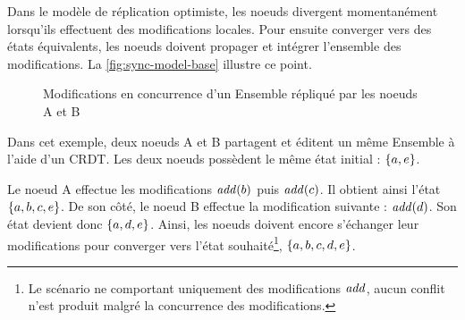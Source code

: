 Dans le modèle de réplication optimiste, les noeuds divergent momentanément lorsqu'ils effectuent des modifications locales.
Pour ensuite converger vers des états équivalents, les noeuds doivent propager et intégrer l'ensemble des modifications.
La \autoref{fig:sync-model-base} illustre ce point.

\begin{figure}[!ht]

  \centering
  \caption{Modifications en concurrence d'un Ensemble répliqué par les noeuds A et B}
  \label{fig:sync-model-base}
\end{figure}

Dans cet exemple, deux noeuds A et B partagent et éditent un même Ensemble à l'aide d'un \ac{CRDT}.
Les deux noeuds possèdent le même état initial : $\left\{a,e\right\}$.

Le noeud A effectue les modifications $\mathit{add}(b)$ puis $\mathit{add}(c)$.
Il obtient ainsi l'état $\left\{a,b,c,e\right\}$.
De son côté, le noeud B effectue la modification suivante : $\mathit{add}(d)$.
Son état devient donc $\left\{a,d,e\right\}$.
Ainsi, les noeuds doivent encore s'échanger leur modifications pour converger vers l'état souhaité\footnote{Le scénario ne comportant uniquement des modifications $\mathit{add}$, aucun conflit n'est produit malgré la concurrence des modifications.}, \ie $\left\{a,b,c,d,e\right\}$.

